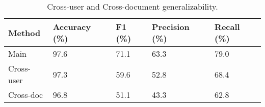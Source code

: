 \begin{table}[]
\caption{Cross-user and Cross-document generalizability.}
\label{tab:cross}
\begin{tabular}{lllll}
\toprule
Method     & Accuracy (\%) & F1 (\%) & Precision (\%) & Recall (\%) \\ \midrule
Main       & 97.6          & 71.1    & 63.3           & 79.0        \\
Cross-user & 97.3          & 59.6    & 52.8           & 68.4        \\
Cross-doc  & 96.8          & 51.1    & 43.3           & 62.8        \\ \bottomrule
\end{tabular}
\end{table}
